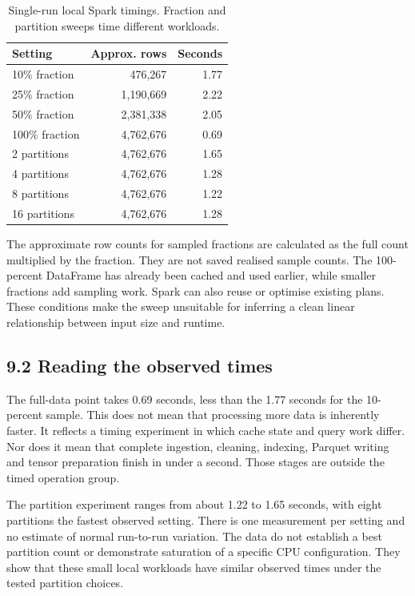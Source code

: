 \documentclass[11pt]{article}
\begin{document}
\begin{table}[t]\centering\small
\setlength{\tabcolsep}{3pt}
\begin{tabular}{lrr}
\toprule
Setting & Approx. rows & Seconds \\ \midrule
10\% fraction & 476,267 & 1.77 \\
25\% fraction & 1,190,669 & 2.22 \\
50\% fraction & 2,381,338 & 2.05 \\
100\% fraction & 4,762,676 & 0.69 \\
2 partitions & 4,762,676 & 1.65 \\
4 partitions & 4,762,676 & 1.28 \\
8 partitions & 4,762,676 & 1.22 \\
16 partitions & 4,762,676 & 1.28 \\
\bottomrule\end{tabular}
\caption{Single-run local Spark timings. Fraction and partition sweeps time different workloads.}\end{table}
The approximate row counts for sampled fractions are calculated as the full count multiplied by the fraction. They are not saved realised sample counts. The 100-percent DataFrame has already been cached and used earlier, while smaller fractions add sampling work. Spark can also reuse or optimise existing plans. These conditions make the sweep unsuitable for inferring a clean linear relationship between input size and runtime.

\subsection*{9.2 Reading the observed times}
The full-data point takes 0.69 seconds, less than the 1.77 seconds for the 10-percent sample. This does not mean that processing more data is inherently faster. It reflects a timing experiment in which cache state and query work differ. Nor does it mean that complete ingestion, cleaning, indexing, Parquet writing and tensor preparation finish in under a second. Those stages are outside the timed operation group.

The partition experiment ranges from about 1.22 to 1.65 seconds, with eight partitions the fastest observed setting. There is one measurement per setting and no estimate of normal run-to-run variation. The data do not establish a best partition count or demonstrate saturation of a specific CPU configuration. They show that these small local workloads have similar observed times under the tested partition choices.
\end{document}
